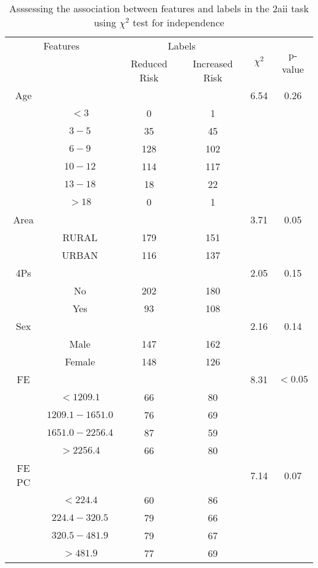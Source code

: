 \begin{table}[!htb]
\centering
\caption{Asssessing the association between features and labels in the 2aii task using $\chi^2$ test for independence}
\label{tab:chitest_2aii}
\begin{tabular}{c c | c c| c | c}
\hline
\multicolumn{2}{c|}{Features}& \multicolumn{2}{c|}{Labels}& \multirow{2}{*}{$\chi^2$} & \multirow{2}{*}{p-value}\\ 
& & Reduced Risk & Increased Risk & & \\ 
\hline
Age &  &  & & 6.54 & 0.26 \\ 
& $< 3$ & 0 & 1& & \\ 
& $3-5$ & 35 & 45& & \\ 
& $6-9$ & 128 & 102& & \\ 
& $10-12$ & 114 & 117& & \\ 
& $13-18$ & 18 & 22& & \\ 
& $> 18$ & 0 & 1& & \\ 
\hline 
Area &  &  & & 3.71 & 0.05 \\ 
& RURAL & 179 & 151& & \\ 
& URBAN & 116 & 137& & \\ 
\hline 
4Ps &  &  & & 2.05 & 0.15 \\ 
& No & 202 & 180& & \\ 
& Yes & 93 & 108& & \\ 
\hline 
Sex &  &  & & 2.16 & 0.14 \\ 
& Male & 147 & 162& & \\ 
& Female & 148 & 126& & \\ 
\hline 
FE &  &  & & 8.31 & $< 0.05$ \\ 
& $< 1209.1$ & 66 & 80& & \\ 
& $1209.1-1651.0$ & 76 & 69& & \\ 
& $1651.0-2256.4$ & 87 & 59& & \\ 
& $> 2256.4$ & 66 & 80& & \\ 
\hline 
FE PC &  &  & & 7.14 & 0.07 \\ 
& $< 224.4$ & 60 & 86& & \\ 
& $224.4-320.5$ & 79 & 66& & \\ 
& $320.5-481.9$ & 79 & 67& & \\ 
& $> 481.9$ & 77 & 69& & \\ 
\hline 
\end{tabular}
\end{table}
